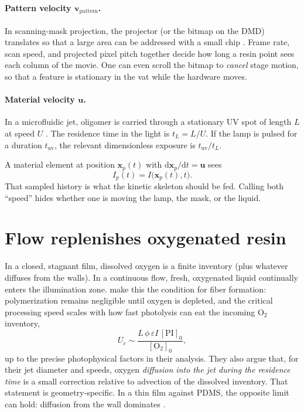 \documentclass[11pt,a4paper]{article}
\begin{document}
\paragraph{Pattern velocity $\mathbf{v}_{\mathrm{pattern}}$.}
In scanning-mask projection, the projector (or the bitmap on the DMD) translates so that a large area can be addressed with a small chip \citep{Meenakshisundaram2020}.
Frame rate, scan speed, and projected pixel pitch together decide how long a resin point sees each column of the movie.
One can even scroll the bitmap to \emph{cancel} stage motion, so that a feature is stationary in the vat while the hardware moves.

\paragraph{Material velocity $\mathbf{u}$.}
In a microfluidic jet, oligomer is carried through a stationary UV spot of length $L$ at speed $U$ \citep{Slutzky2019}.
The residence time in the light is $t_L = L/U$.
If the lamp is pulsed for a duration $t_{\mathrm{uv}}$, the relevant dimensionless exposure is $t_{\mathrm{uv}}/t_L$.

A material element at position $\mathbf{x}_p(t)$ with $\mathrm{d}\mathbf{x}_p/\mathrm{d}t=\mathbf{u}$ sees
\begin{equation}
  I_p(t) = I\bigl(\mathbf{x}_p(t),t\bigr).
\end{equation}
That sampled history is what the kinetic skeleton should be fed.
Calling both ``speed'' hides whether one is moving the lamp, the mask, or the liquid.

\section{Flow replenishes oxygenated resin}

In a closed, stagnant film, dissolved oxygen is a finite inventory (plus whatever diffuses from the walls).
In a continuous flow, fresh, oxygenated liquid continually enters the illumination zone.
\citet{Slutzky2019} make this the condition for fiber formation: polymerization remains negligible until oxygen is depleted, and the critical processing speed scales with how fast photolysis can eat the incoming $\mathrm{O}_2$ inventory,
\begin{equation}
  U_c \sim \frac{L\,\phi\,\varepsilon I\,[\mathrm{PI}]_0}{[\mathrm{O}_2]_0},
  \label{eq:Uc}
\end{equation}
up to the precise photophysical factors in their analysis.
They also argue that, for their jet diameter and speeds, oxygen \emph{diffusion into the jet during the residence time} is a small correction relative to advection of the dissolved inventory.
That statement is geometry-specific.
In a thin film against PDMS, the opposite limit can hold: diffusion from the wall dominates \citep{Dendukuri2008}.
\end{document}
